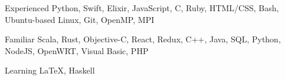 

\begin{cvskills}

  \cvskill
  {Experienced} %
  {Python, Swift, Elixir, JavaScript, C, Ruby, HTML/CSS, Bash, Ubuntu-based Linux, Git, OpenMP, MPI} %

  \cvskill
  {Familiar} %
  {Scala, Rust, Objective-C, React, Redux, C++, Java, SQL, Python, NodeJS, OpenWRT, Visual Basic, PHP} %

  \cvskill
  {Learning} %
  {\LaTeX, Haskell} %



\end{cvskills}
